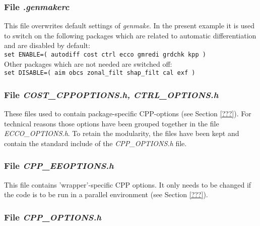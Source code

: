 \subsubsection{File {\it .genmakerc}}
\label{www:tutorials}
This file overwrites default settings of {\it genmake}.
In the present example it is used to switch on the following
packages which are related to automatic differentiation
and are disabled by default: \\
\hspace*{4ex} {\tt set ENABLE=( autodiff cost ctrl ecco gmredi grdchk kpp )}  \\
Other packages which are not needed are switched off: \\
\hspace*{4ex} {\tt set DISABLE=( aim obcs zonal\_filt shap\_filt cal exf )}

\subsubsection{File {\it COST\_CPPOPTIONS.h,  CTRL\_OPTIONS.h}}
\label{www:tutorials}

These files used to contain package-specific CPP-options
(see Section \ref{???}).
For technical reasons those options have been grouped together
in the file {\it ECCO\_OPTIONS.h}.
To retain the modularity, the files have been kept and contain
the standard include of the {\it CPP\_OPTIONS.h} file.

\subsubsection{File {\it CPP\_EEOPTIONS.h}}
\label{www:tutorials}

This file contains 'wrapper'-specific CPP options.
It only needs to be changed if the code is to be run
in a parallel environment (see Section \ref{???}).

\subsubsection{File {\it CPP\_OPTIONS.h}}
\label{www:tutorials}

